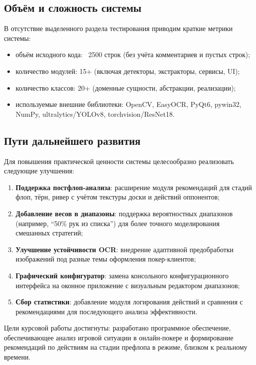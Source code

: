 \subsection*{Объём и сложность системы}

В отсутствие выделенного раздела тестирования приводим краткие метрики системы:
\begin{itemize}
    \item объём исходного кода: ~2500 строк (без учёта комментариев и пустых строк);
    \item количество модулей: 15+ (включая детекторы, экстракторы, сервисы, UI);
    \item количество классов: 20+ (доменные сущности, абстракции, реализации);
    \item используемые внешние библиотеки: OpenCV, EasyOCR, PyQt6, pywin32, NumPy, ultralytics/YOLOv8, torchvision/ResNet18.
\end{itemize}

\subsection*{Пути дальнейшего развития}

Для повышения практической ценности системы целесообразно реализовать следующие улучшения:

\begin{enumerate}
    \item \textbf{Поддержка постфлоп-анализа}: расширение модуля рекомендаций для стадий флоп, тёрн, ривер с учётом текстуры доски и действий оппонентов;
    
    \item \textbf{Добавление весов в диапазоны}: поддержка вероятностных диапазонов (например, ``50\% рук из списка'') для более точного моделирования смешанных стратегий;
    
    \item \textbf{Улучшение устойчивости OCR}: внедрение адаптивной предобработки изображений под разные темы оформления покер-клиентов;
    
    \item \textbf{Графический конфигуратор}: замена консольного конфигурационного интерфейса на оконное приложение с визуальным редактором диапазонов;
    
    \item \textbf{Сбор статистики}: добавление модуля логирования действий и сравнения с рекомендациями для последующего анализа эффективности.
\end{enumerate}

Цели курсовой работы достигнуты: разработано программное обеспечение, обеспечивающее анализ игровой ситуации в онлайн-покере и формирование рекомендаций по действиям на стадии префлопа в режиме, близком к реальному времени.
